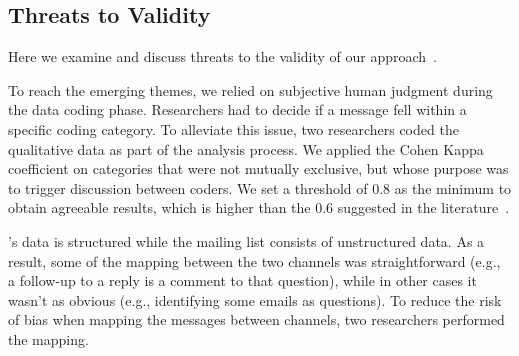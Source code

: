 

\subsection{Threats to Validity}
\label{cha:threats}
Here we examine and discuss threats to the validity of our approach~\cite{Runeson2012}.

\begin{description}[itemsep=3pt, topsep=2pt, leftmargin=1em, parsep=0pt]

\item[Construct validity:] To reach the emerging themes, we relied on subjective human judgment during the data coding phase. Researchers had to decide if a message fell within a specific coding category. To alleviate this issue, two researchers coded the qualitative data as part of the analysis process. We applied the Cohen Kappa coefficient on categories that were not mutually exclusive, but whose purpose was to trigger discussion between coders. We set a threshold of 0.8 as the minimum to obtain agreeable results, which is higher than the 0.6 suggested in the literature~\cite{Landis1977}.

\item[Internal validity:] \SO's data is structured while the \RH mailing list consists of unstructured data. As a result, some of the mapping between the two channels was straightforward (e.g., a follow-up to a reply is a comment to that question), while in other cases it wasn't as obvious (e.g., identifying some emails as questions). To reduce the risk of bias when mapping the messages between channels, two researchers performed the mapping.  




\end{description}
